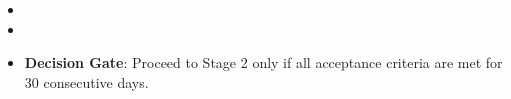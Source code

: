 \begin{itemize}
        \begin{itemize}
            \item Material degradation from UV or thermal cycling.
            \item Lift gas leakage exceeding predictions.
            \item Station-keeping failure under unexpected wind shear.
            \item Power system insufficiency during extended cloudy periods.
        \end{itemize}
    \item \item \item \textbf{Decision Gate}: Proceed to Stage 2 only if all acceptance criteria are met for 30 consecutive days.
\end{itemize}

